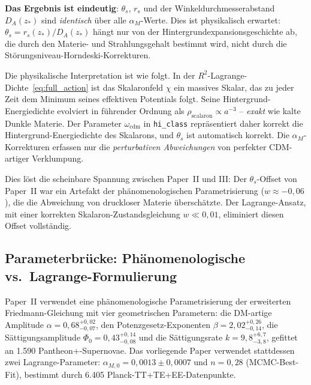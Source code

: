 \documentclass[11pt,a4paper]{article}
\begin{document}
\textbf{Das Ergebnis ist eindeutig}: $\theta_s$, $r_s$ und der Winkeldurchmesserabstand $D_A(z_*)$ sind \textit{identisch} \"uber alle $\alpha_M$-Werte. Dies ist physikalisch erwartet: $\theta_s = r_s(z_*)/D_A(z_*)$ h\"angt nur von der Hintergrundexpansionsgeschichte ab, die durch den Materie- und Strahlungsgehalt bestimmt wird, nicht durch die St\"orungsniveau-Horndeski-Korrekturen.

Die physikalische Interpretation ist wie folgt. In der $R^2$-Lagrange-Dichte~\eqref{eq:full_action} ist das Skalaronfeld $\chi$ ein massives Skalar, das zu jeder Zeit dem Minimum seines effektiven Potentials folgt. Seine Hintergrund-Energiedichte evolviert in f\"uhrender Ordnung als $\rho_{\mathrm{scalaron}} \propto a^{-3}$ -- \textit{exakt} wie kalte Dunkle Materie. Der Parameter $\omega_{\mathrm{cdm}}$ in \texttt{hi\_class} repr\"asentiert daher korrekt die Hintergrund-Energiedichte des Skalarons, und $\theta_s$ ist automatisch korrekt. Die $\alpha_M$-Korrekturen erfassen nur die \textit{perturbativen Abweichungen} von perfekter CDM-artiger Verklumpung.

Dies l\"ost die scheinbare Spannung zwischen Paper~II und III: Der $\theta_s$-Offset von Paper~II war ein Artefakt der ph\"anomenologischen Parametrisierung ($w \approx -0{,}06$), die die Abweichung von druckloser Materie \"ubersch\"atzte. Der Lagrange-Ansatz, mit einer korrekten Skalaron-Zustandsgleichung $w \ll 0{,}01$, eliminiert diesen Offset vollst\"andig.

\subsection{Parameterbr\"ucke: Ph\"anomenologische vs.\ Lagrange-Formulierung}
\label{subsec:parameter_bridge}

Paper~II verwendet eine ph\"anomenologische Parametrisierung der erweiterten Friedmann-Gleichung mit vier geometrischen Parametern: die DM-artige Amplitude $\alpha = 0{,}68^{+0{,}02}_{-0{,}07}$, den Potenzgesetz-Exponenten $\beta = 2{,}02^{+0{,}26}_{-0{,}14}$, die S\"attigungsamplitude $\Phi_0 = 0{,}43^{+0{,}14}_{-0{,}08}$ und die S\"attigungsrate $k = 9{,}8^{+6{,}7}_{-3{,}8}$, gefittet an 1.590 Pantheon+-Supernovae. Das vorliegende Paper verwendet stattdessen zwei Lagrange-Parameter: $\alpha_{M,0} = 0{,}0013 \pm 0{,}0007$ und $n = 0{,}28$ (MCMC-Best-Fit), bestimmt durch 6.405 Planck-TT+TE+EE-Datenpunkte.
\end{document}

